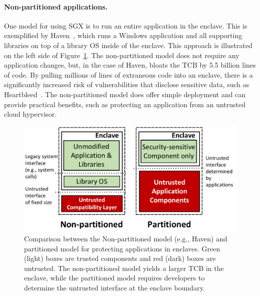 \paragraph{Non-partitioned applications.}
One model for using SGX is to run an entire application in the enclave.
This is exemplified by Haven~\citep{baumann14haven}, which runs a Windows application and all supporting libraries
on top of a library OS inside of the enclave.  This approach is illustrated on the left side of Figure~\ref{fig:libosvssdk}.
The non-partitioned model does not require any application changes, but, in the case of Haven, bloats the TCB by 5.5 billion lines of code.
By pulling millions of lines of extraneous code into an enclave, there is a significantly increased risk 
of vulnerabilities that disclose
sensitive data, such as Heartbleed~\citep{heartbleed}.
The non-partitioned model does offer simple deployment and can provide practical benefits, 
such as protecting an application from an untrusted cloud hypervisor.

\begin{figure}[t!]
	\centering
	\includegraphics[width=\linewidth]{civet/figures/libosvssdk.pdf}
	\footnotesize
	\vspace{-0.2in}
	\caption{
		Comparison between the Non-partitioned model (e.g., Haven)
		and partitioned model for protecting applications in enclaves.
		Green (light) boxes are trusted components and red (dark) boxes are untrusted.
		The non-partitioned model yields a larger TCB in the enclave,
		while the partitioned model requires developers to determine the untrusted interface at the enclave boundary.
	}
	\label{fig:libosvssdk}
\end{figure}


